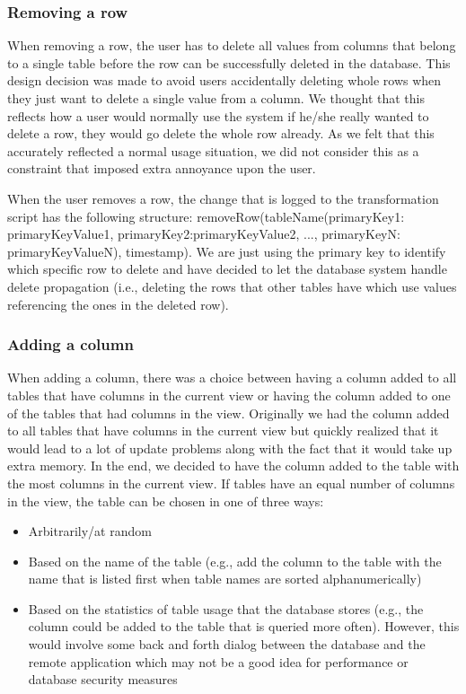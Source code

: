 \documentclass[12pt]{article}
\begin{document}
\subsubsection{Removing a row}
\label{sec:remove_row}
When removing a row, the user has to delete all values from columns that belong to a single table before the row can be successfully deleted in the database. This design decision was made to avoid users accidentally deleting whole rows when they just want to delete a single value from a column. We thought that this reflects how a user would normally use the system \textemdash if he/she really wanted to delete a row, they would go delete the whole row already. As we felt that this accurately reflected a normal usage situation, we did not consider this as a constraint that imposed extra annoyance upon the user.

When the user removes a row, the change that is logged to the transformation script has the following structure:
removeRow(tableName(primaryKey1:\\primaryKeyValue1, primaryKey2:primaryKeyValue2, ..., primaryKeyN:\\primaryKeyValueN), timestamp). We are just using the primary key to identify which specific row to delete and have decided to let the database system handle delete propagation (i.e., deleting the rows that other tables have which use values referencing the ones in the deleted row).

\subsubsection{Adding a column}
\label{sec:add_col}
When adding a column, there was a choice between having a column added to all tables that have columns in the current view or having the column added to one of the tables that had columns in the view. Originally we had the column added to all tables that have columns in the current view but quickly realized that it would lead to a lot of update problems along with the fact that it would take up extra memory. In the end, we decided to have the column added to the table with the most columns in the current view. If tables have an equal number of columns in the view, the table can be chosen in one of three ways:
\begin{itemize}
\item {Arbitrarily/at random}
\item {Based on the name of the table (e.g., add the column to the table with the name that is listed first when table names are sorted alphanumerically)}
\item {Based on the statistics of table usage that the database stores (e.g., the column could be added to the table that is queried more often). However, this would involve some back and forth dialog between the database and the remote application which may not be a good idea for performance or database security measures}
\end{itemize}
\end{document}
